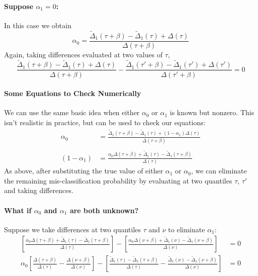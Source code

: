 \documentclass[12pt]{article}
\begin{document}
\paragraph{Suppose $\alpha_1 = 0$:}
In this case we obtain
\[
  \alpha_0 = \frac{\widetilde{\Delta}_1(\tau + \beta) - \widetilde{\Delta}_1(\tau) + \Delta(\tau)}{\Delta(\tau + \beta)}
\]
Again, taking differences evaluated at two values of $\tau$,
\[
  \frac{\widetilde{\Delta}_1(\tau + \beta) - \widetilde{\Delta}_1(\tau) + \Delta(\tau)}{\Delta(\tau + \beta)} - 
  \frac{\widetilde{\Delta}_1(\tau' + \beta) - \widetilde{\Delta}_1(\tau') + \Delta(\tau')}{\Delta(\tau' + \beta)} = 0
\]

\paragraph{Some Equations to Check Numerically}
We can use the same basic idea when either $\alpha_0$ or $\alpha_1$ is known but nonzero.
This isn't realistic in practice, but can be used to check our equations:
\begin{align*}
  \alpha_0 &= \frac{\widetilde{\Delta}_1(\tau + \beta) - \widetilde{\Delta}_1(\tau) + (1 - \alpha_1) \Delta(\tau)}{\Delta(\tau + \beta)}\\ \\
  (1 - \alpha_1) &= \frac{\alpha_0 \Delta(\tau + \beta) + \widetilde{\Delta}_1(\tau) - \widetilde{\Delta}_1(\tau + \beta)}{\Delta(\tau)}
\end{align*}
As above, after substituting the true value of either $\alpha_1$ or $\alpha_0$, we can eliminate the remaining mis-classification probability by evaluating at two quantiles $\tau$, $\tau'$ and taking differences.

\paragraph{What if $\alpha_0$ and $\alpha_1$ are both unknown?}
Suppose we take differences at two quantiles $\tau$ and $\nu$ to eliminate $\alpha_1$:
\begin{align*}
  \left[\frac{\alpha_0 \Delta(\tau + \beta) + \widetilde{\Delta}_1(\tau) - \widetilde{\Delta}_1(\tau + \beta)}{\Delta(\tau)}\right]
  - \left[\frac{\alpha_0 \Delta(\nu + \beta) + \widetilde{\Delta}_1(\nu) - \widetilde{\Delta}_1(\nu + \beta)}{\Delta(\nu)}\right] &= 0 \\ 
  \alpha_0 \left[ \frac{\Delta(\tau+ \beta)}{\Delta(\tau)} - \frac{\Delta(\nu + \beta)}{\Delta(\nu)} \right] - \left[ \frac{\widetilde{\Delta}_1(\tau) - \widetilde{\Delta}_1(\tau+ \beta)}{\Delta(\tau)} - \frac{\widetilde{\Delta}_1(\nu) - \widetilde{\Delta}_1(\nu + \beta)}{\Delta(\nu)}\right] &= 0
 \end{align*}
\end{document}
